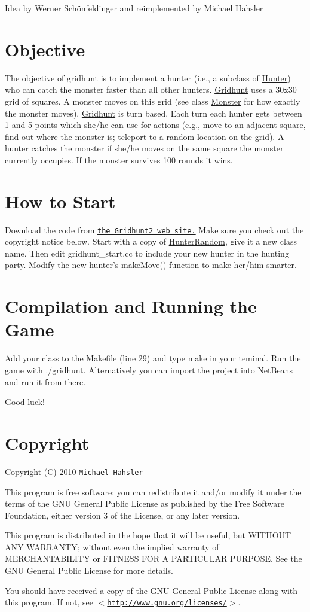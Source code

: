 Idea by Werner Schönfeldinger and reimplemented by Michael Hahsler\hypertarget{index_o}{}\section{Objective}\label{index_o}
The objective of gridhunt is to implement a hunter (i.e., a subclass of \hyperlink{classHunter}{Hunter}) who can catch the monster faster than all other hunters. \hyperlink{classGridhunt}{Gridhunt} uses a 30x30 grid of squares. A monster moves on this grid (see class \hyperlink{classMonster}{Monster} for how exactly the monster moves). \hyperlink{classGridhunt}{Gridhunt} is turn based. Each turn each hunter gets between 1 and 5 points which she/he can use for actions (e.g., move to an adjacent square, find out where the monster is; teleport to a random location on the grid). A hunter catches the monster if she/he moves on the same square the monster currently occupies. If the monster survives 100 rounds it wins.\hypertarget{index_howto}{}\section{How to Start}\label{index_howto}
Download the code from \href{http://michael.hahsler.net/SMU/1342/gridhunt2/}{\tt the Gridhunt2 web site.} Make sure you check out the copyright notice below. Start with a copy of \hyperlink{classHunterRandom}{HunterRandom}, give it a new class name. Then edit gridhunt\_\-start.cc to include your new hunter in the hunting party. Modify the new hunter's makeMove() function to make her/him smarter.\hypertarget{index_cr}{}\section{Compilation and Running the Game}\label{index_cr}
Add your class to the Makefile (line 29) and type make in your teminal. Run the game with ./gridhunt. Alternatively you can import the project into NetBeans and run it from there.

Good luck!\hypertarget{index_copy}{}\section{Copyright}\label{index_copy}
Copyright (C) 2010 \href{http://michael.hahsler.net}{\tt Michael Hahsler}

This program is free software: you can redistribute it and/or modify it under the terms of the GNU General Public License as published by the Free Software Foundation, either version 3 of the License, or any later version.

This program is distributed in the hope that it will be useful, but WITHOUT ANY WARRANTY; without even the implied warranty of MERCHANTABILITY or FITNESS FOR A PARTICULAR PURPOSE. See the GNU General Public License for more details.

You should have received a copy of the GNU General Public License along with this program. If not, see $<$\href{http://www.gnu.org/licenses/}{\tt http://www.gnu.org/licenses/}$>$. 